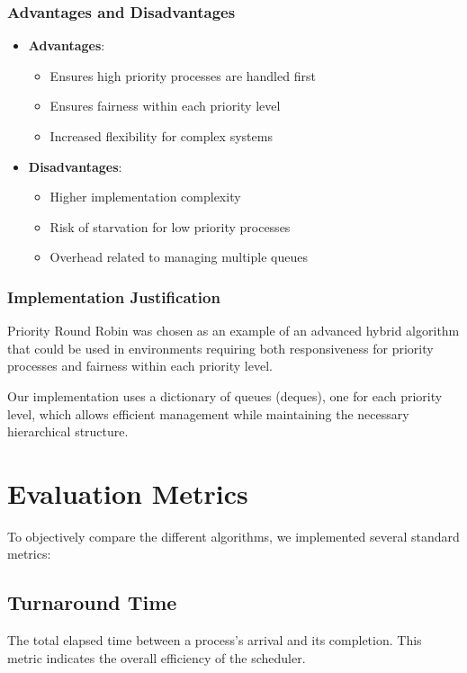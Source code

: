 \documentclass[12pt,a4paper]{article}
\begin{document}
\subsubsection{Advantages and Disadvantages}
\begin{itemize}
    \item \textbf{Advantages}:
    \begin{itemize}
        \item Ensures high priority processes are handled first
        \item Ensures fairness within each priority level
        \item Increased flexibility for complex systems
    \end{itemize}
    \item \textbf{Disadvantages}:
    \begin{itemize}
        \item Higher implementation complexity
        \item Risk of starvation for low priority processes
        \item Overhead related to managing multiple queues
    \end{itemize}
\end{itemize}

\subsubsection{Implementation Justification}
Priority Round Robin was chosen as an example of an advanced hybrid algorithm that could be used in environments requiring both responsiveness for priority processes and fairness within each priority level.

Our implementation uses a dictionary of queues (deques), one for each priority level, which allows efficient management while maintaining the necessary hierarchical structure.

\section{Evaluation Metrics}
To objectively compare the different algorithms, we implemented several standard metrics:

\subsection{Turnaround Time}
The total elapsed time between a process's arrival and its completion. This metric indicates the overall efficiency of the scheduler.
\end{document}
